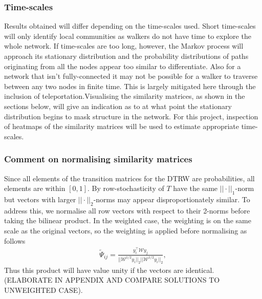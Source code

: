 \documentclass[12pt,a4paper]{article}
\begin{document}
\subsubsection{Time-scales}
Results obtained will differ depending on the time-scales used. Short time-scales will only identify local communities as walkers do not have time to explore the whole network. If time-scales are too long, however, the Markov process will approach its stationary distribution and the probability distributions of paths originating from all the nodes appear too similar to differentiate. Also for a network that isn't fully-connected it may not be possible for a walker to traverse between any two nodes in finite time. This is largely mitigated here through the inclusion of teleportation.Visualising the similarity matrices, as shown in the sections below, will give an indication as to at what point the stationary distribution begins to mask structure in the network. For this project, inspection of heatmaps of the similarity matrices will be used to estimate appropriate time-scales.

\subsubsection{Comment on normalising similarity matrices}
Since all elements of the transition matrices for the DTRW are probabilities, all elements are within $[0,1]$. By row-stochasticity of $T$ have the same $||\cdot||_1$-norm but vectors with larger $||\cdot||_2$-norms may appear disproportionately similar. To address this, we normalise all row vectors with respect to their 2-norms before taking the bilinear product. In the weighted case, the weighting is on the same scale as the original vectors, so the weighting is applied before normalising as follows
\begin{align*}
  \tilde \Psi_{ij} = \frac{y_i^\top \mathcal W y_j} {||\mathcal W^{1/2} y_i||_2 ||\mathcal W^{1/2} y_i||_2},
\end{align*}
Thus this product will have value unity if the vectors are identical. (ELABORATE IN APPENDIX AND COMPARE SOLUTIONS TO UNWEIGHTED CASE).
\end{document}
